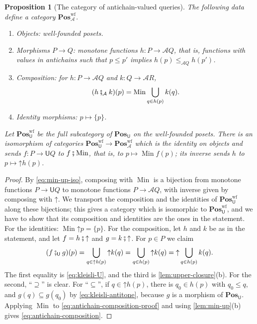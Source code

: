 \documentclass[11pt,a4paper]{article}
\theoremstyle{plain}
\newtheorem{proposition}[theorem]{Proposition}
\theoremstyle{definition}
\theoremstyle{remark}
\newcommand{\Cat}[1]{\mathbf{#1}}
\newcommand{\Pos}{\Cat{Pos}}
\newcommand{\U}{\mathsf{U}}
\newcommand{\An}{\mathcal{A}}
\newcommand{\PosU}{\Pos_{\U}}
\newcommand{\PosA}{\Pos^{\mathrm{wf}}_{\An}}
\newcommand{\PosUwf}{\Pos^{\mathrm{wf}}_{\U}}
\newcommand{\then}{\mathbin{\fatsemi}}
\newcommand{\thenU}{\mathbin{\fatsemi_{\U}}}
\newcommand{\thenA}{\mathbin{\fatsemi_{\An}}}
\newcommand{\up}{\mathord{\uparrow}}
\DeclareMathOperator{\Min}{Min}
\begin{document}
\begin{proposition}[The category of antichain-valued queries]
    \label{prop:antichain-category}
    The following data define a category $\PosA$.
    \begin{enumerate}
        \item Objects: well-founded posets.
        \item Morphisms $P \to Q$: monotone functions $h \colon P \to \An Q$, that is, functions with values in antichains such that $p \leq p'$ implies $h(p) \leq_{\An Q} h(p')$.
        \item Composition: for $h \colon P \to \An Q$ and $k \colon Q \to \An R$,
              \begin{equation}
                  \label{eq:antichain-composition}
                  (h \thenA k)(p) = \Min \bigcup_{q \in h(p)} k(q).
              \end{equation}
        \item Identity morphisms: $p \mapsto \{p\}$.
    \end{enumerate}
    Let $\PosUwf$ be the full subcategory of $\PosU$ on the well-founded posets.
    There is an isomorphism of categories $\PosUwf \to \PosA$ which is the identity on objects and sends $f \colon P \to \U Q$ to $f \then \Min$, that is, to $p \mapsto \Min f(p)$; its inverse sends $h$ to $p \mapsto \up h(p)$.
\end{proposition}
\begin{proof}
    By \cref{eq:min-up-iso}, composing with $\Min$ is a bijection from monotone functions $P \to \U Q$ to monotone functions $P \to \An Q$, with inverse given by composing with $\up$.
    We transport the composition and the identities of $\PosUwf$ along these bijections; this gives a category which is isomorphic to $\PosUwf$, and we have to show that its composition and identities are the ones in the statement.
    For the identities: $\Min \up p = \{p\}$.
    For the composition, let $h$ and $k$ be as in the statement, and let $f = h \then \up$ and $g = k \then \up$.
    For $p \in P$ we claim
    \begin{equation}
        \label{eq:antichain-composition-proof}
        (f \thenU g)(p)
        = \bigcup_{q \in \up h(p)} \up k(q)
        = \bigcup_{q \in h(p)} \up k(q)
        = \up \bigcup_{q \in h(p)} k(q).
    \end{equation}
    The first equality is \cref{eq:kleisli-U}, and the third is \cref{lem:upper-closure}(b).
    For the second, ``$\supseteq$'' is clear.
    For ``$\subseteq$'', if $q \in \up h(p)$, there is $q_0 \in h(p)$ with $q_0 \leq q$, and $g(q) \subseteq g(q_0)$ by \cref{eq:kleisli-antitone}, because $g$ is a morphism of $\PosU$.
    Applying $\Min$ to \cref{eq:antichain-composition-proof} and using \cref{lem:min-up}(b) gives \cref{eq:antichain-composition}.
\end{proof}
\end{document}
